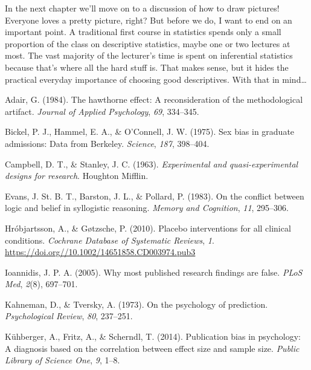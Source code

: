 \documentclass[
  a4paper,
]{book}
\newlength{\cslhangindent}
\newlength{\cslentryspacingunit} %
\newenvironment{CSLReferences}[2] %
 {%
  \setlength{\parindent}{0pt}
  \ifodd #1
  \let\oldpar\par
  \def\par{\hangindent=\cslhangindent\oldpar}
  \fi
  \setlength{\parskip}{#2\cslentryspacingunit}
 }%
 {}
\begin{document}
In the next chapter we'll move on to a discussion of how to draw
pictures! Everyone loves a pretty picture, right? But before we do, I
want to end on an important point. A traditional first course in
statistics spends only a small proportion of the class on descriptive
statistics, maybe one or two lectures at most. The vast majority of the
lecturer's time is spent on inferential statistics because that's where
all the hard stuff is. That makes sense, but it hides the practical
everyday importance of choosing good descriptives. With that in
mind\ldots{}

\hypertarget{refs}{}
\begin{CSLReferences}{1}{0}
\leavevmode{}%
Adair, G. (1984). The hawthorne effect: A reconsideration of the
methodological artifact. \emph{Journal of Applied Psychology},
\emph{69}, 334--345.

\leavevmode{}%
Bickel, P. J., Hammel, E. A., \& O'Connell, J. W. (1975). Sex bias in
graduate admissions: Data from {B}erkeley. \emph{Science}, \emph{187},
398--404.

\leavevmode{}%
Campbell, D. T., \& Stanley, J. C. (1963). \emph{Experimental and
quasi-experimental designs for research}. Houghton Mifflin.

\leavevmode{}%
Evans, J. St. B. T., Barston, J. L., \& Pollard, P. (1983). On the
conflict between logic and belief in syllogistic reasoning. \emph{Memory
and Cognition}, \emph{11}, 295--306.

\leavevmode{}%
Hróbjartsson, A., \& Gøtzsche, P. (2010). Placebo interventions for all
clinical conditions. \emph{Cochrane Database of Systematic Reviews},
\emph{1}. \url{https://doi.org//10.1002/14651858.CD003974.pub3}

\leavevmode{}%
Ioannidis, J. P. A. (2005). Why most published research findings are
false. \emph{PLoS Med}, \emph{2}(8), 697--701.

\leavevmode{}%
Kahneman, D., \& Tversky, A. (1973). On the psychology of prediction.
\emph{Psychological Review}, \emph{80}, 237--251.

\leavevmode{}%
Kühberger, A., Fritz, A., \& Scherndl, T. (2014). Publication bias in
psychology: A diagnosis based on the correlation between effect size and
sample size. \emph{Public Library of Science One}, \emph{9}, 1--8.


\end{CSLReferences}
\end{document}
